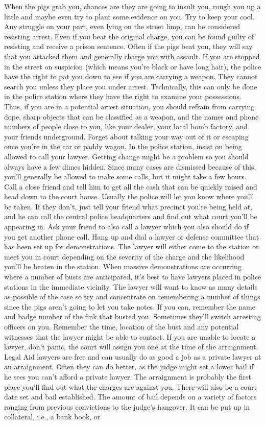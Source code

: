 \documentclass[11pt,twoside,a4paper]{book}
\begin{document}
When the pigs grab you, chances are they are going to insult you, rough you up a little and maybe even try to plant some evidence on you. Try to keep your cool. Any struggle on your part, even lying on the street limp, can be considered resisting arrest. Even if you beat the original charge, you can be found guilty of resisting and receive a prison sentence. Often if the pigs beat you, they will say that you attacked them and generally charge you with assault. If you are stopped in the street on suspicion (which means you're black or have long hair), the police have the right to pat you down to see if you are carrying a weapon. They cannot search you unless they place you under arrest. Technically, this can only be done in the police station where they have the right to examine your possessions. Thus, if you are in a potential arrest situation, you should refrain from carrying dope, sharp objects that can be classified as a weapon, and the names and phone numbers of people close to you, like your dealer, your local bomb factory, and your friends underground. Forget about talking your way out of it or escaping once you're in the car or paddy wagon. In the police station, insist on being allowed to call your lawyer. Getting change might be a problem so you should always have a few dimes hidden. Since many cases are dismissed because of this, you'll generally be allowed to make some calls, but it might take a few hours. Call a close friend and tell him to get all the cash that can be quickly raised and head down to the court house. Usually the police will let you know where you'll be taken. If they don't, just tell your friend what precinct you're being held at, and he can call the central police headquarters and find out what court you'll be appearing in. Ask your friend to also call a lawyer which you also should do if you get another phone call. Hang up and dial a lawyer or defense committee that has been set up for demonstrations. The lawyer will either come to the station or meet you in court depending on the severity of the charge and the likelihood you'll be beaten in the station. When massive demonstrations are occurring where a number of busts are anticipated, it's best to have lawyers placed in police stations in the immediate vicinity. The lawyer will want to know as many details as possible of the case so try and concentrate on remembering a number of things since the pigs aren't going to let you take notes. If you can, remember the name and badge number of the fink that busted you. Sometimes they'll switch arresting officers on you. Remember the time, location of the bust and any potential witnesses that the lawyer might be able to contact. If you are unable to locate a lawyer, don't panic, the court will assign you one at the time of the arraignment. Legal Aid lawyers are free and can usually do as good a job as a private lawyer at an arraignment. Often they can do better, as the judge might set a lower bail if he sees you can't afford a private lawyer. The arraignment is probably the first place you'll find out what the charges are against you. There will also be a court date set and bail established. The amount of bail depends on a variety of factors ranging from previous convictions to the judge's hangover. It can be put up in collateral, i.e., a bank book, or 
\end{document}
